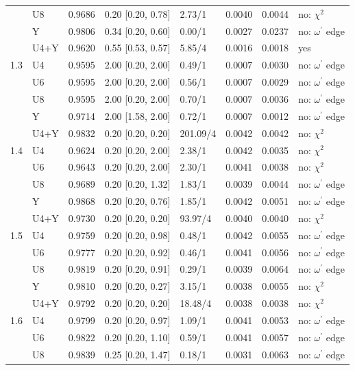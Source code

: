 {\begin{longtable}{@{}llllllll@{}}
 & U8 & 0.9686 & 0.20 [0.20, 0.78] & 2.73/1 & 0.0040 & 0.0044 & no: $\chi^2$ \\
 & Y & 0.9806 & 0.34 [0.20, 0.60] & 0.00/1 & 0.0027 & 0.0237 & no: $\omega^\prime$ edge \\
 & U4+Y & 0.9620 & 0.55 [0.53, 0.57] & 5.85/4 & 0.0016 & 0.0018 & yes \\
1.3 & U4 & 0.9595 & 2.00 [0.20, 2.00] & 0.49/1 & 0.0007 & 0.0030 & no: $\omega^\prime$ edge \\
 & U6 & 0.9595 & 2.00 [0.20, 2.00] & 0.56/1 & 0.0007 & 0.0029 & no: $\omega^\prime$ edge \\
 & U8 & 0.9595 & 2.00 [0.20, 2.00] & 0.70/1 & 0.0007 & 0.0036 & no: $\omega^\prime$ edge \\
 & Y & 0.9714 & 2.00 [1.58, 2.00] & 0.72/1 & 0.0007 & 0.0012 & no: $\omega^\prime$ edge \\
 & U4+Y & 0.9832 & 0.20 [0.20, 0.20] & 201.09/4 & 0.0042 & 0.0042 & no: $\chi^2$ \\
1.4 & U4 & 0.9624 & 0.20 [0.20, 2.00] & 2.38/1 & 0.0042 & 0.0035 & no: $\chi^2$ \\
 & U6 & 0.9643 & 0.20 [0.20, 2.00] & 2.30/1 & 0.0041 & 0.0038 & no: $\chi^2$ \\
 & U8 & 0.9689 & 0.20 [0.20, 1.32] & 1.83/1 & 0.0039 & 0.0044 & no: $\omega^\prime$ edge \\
 & Y & 0.9868 & 0.20 [0.20, 0.76] & 1.85/1 & 0.0042 & 0.0051 & no: $\omega^\prime$ edge \\
 & U4+Y & 0.9730 & 0.20 [0.20, 0.20] & 93.97/4 & 0.0040 & 0.0040 & no: $\chi^2$ \\
1.5 & U4 & 0.9759 & 0.20 [0.20, 0.98] & 0.48/1 & 0.0042 & 0.0055 & no: $\omega^\prime$ edge \\
 & U6 & 0.9777 & 0.20 [0.20, 0.92] & 0.46/1 & 0.0041 & 0.0056 & no: $\omega^\prime$ edge \\
 & U8 & 0.9819 & 0.20 [0.20, 0.91] & 0.29/1 & 0.0039 & 0.0064 & no: $\omega^\prime$ edge \\
 & Y & 0.9810 & 0.20 [0.20, 0.27] & 3.15/1 & 0.0038 & 0.0055 & no: $\chi^2$ \\
 & U4+Y & 0.9792 & 0.20 [0.20, 0.20] & 18.48/4 & 0.0038 & 0.0038 & no: $\chi^2$ \\
1.6 & U4 & 0.9799 & 0.20 [0.20, 0.97] & 1.09/1 & 0.0041 & 0.0053 & no: $\omega^\prime$ edge \\
 & U6 & 0.9822 & 0.20 [0.20, 1.10] & 0.59/1 & 0.0041 & 0.0057 & no: $\omega^\prime$ edge \\
 & U8 & 0.9839 & 0.25 [0.20, 1.47] & 0.18/1 & 0.0031 & 0.0063 & no: $\omega^\prime$ edge \\

\end{longtable}}

